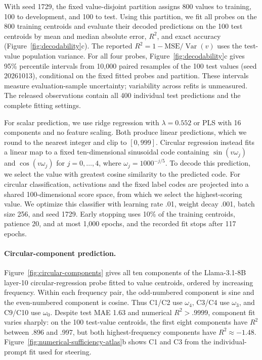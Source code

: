 \documentclass[11pt]{article}
\begin{document}
With seed 1729, the fixed value-disjoint partition assigns 800 values to training, 100 to development, and 100 to test.
Using this partition, we fit all probes on the 800 training centroids and evaluate their decoded predictions on the 100 test centroids by mean and median absolute error, $R^2$, and exact accuracy (Figure~\ref{fig:decodability}c).
The reported $R^2=1-\mathrm{MSE}/\operatorname{Var}(v)$ uses the test-value population variance.
For all four probes, Figure~\ref{fig:decodability}c gives 95\% percentile intervals from 10,000 paired resamples of the 100 test values (seed 20261013), conditional on the fixed fitted probes and partition.
These intervals measure evaluation-sample uncertainty; variability across refits is unmeasured.
The released observations contain all 400 individual test predictions and the complete fitting settings.

For scalar prediction, we use ridge regression with $\lambda=0.552$ or PLS with 16 components and no feature scaling.
Both produce linear predictions, which we round to the nearest integer and clip to $[0,999]$.
Circular regression instead fits a linear map to a fixed ten-dimensional sinusoidal code containing $\sin(v\omega_j)$ and $\cos(v\omega_j)$ for $j=0,\ldots,4$, where $\omega_j=1000^{-j/5}$.
To decode this prediction, we select the value with greatest cosine similarity to the predicted code.
For circular classification, activations and the fixed label codes are projected into a shared 100-dimensional score space, from which we select the highest-scoring value.
We optimize this classifier with learning rate .01, weight decay .001, batch size 256, and seed 1729.
Early stopping uses 10\% of the training centroids, patience 20, and at most 1,000 epochs, and the recorded fit stops after 117 epochs.

\paragraph{Circular-component prediction.}

Figure~\ref{fig:circular-components} gives all ten components of the Llama-3.1-8B layer-10 circular-regression probe fitted to value centroids, ordered by increasing frequency.
Within each frequency pair, the odd-numbered component is sine and the even-numbered component is cosine.
Thus C1/C2 use $\omega_4$, C3/C4 use $\omega_3$, and C9/C10 use $\omega_0$.
Despite test MAE 1.63 and numerical $R^2>.9999$, component fit varies sharply: on the 100 test-value centroids, the first eight components have $R^2$ between .896 and .997, but both highest-frequency components have $R^2\approx-1.48$.
Figure~\ref{fig:numerical-sufficiency-atlas}b shows C1 and C3 from the individual-prompt fit used for steering.
\end{document}

